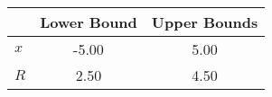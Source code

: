 \begin{tiny}\begin{tabular}{|l|c|c|}
\hline
&\textbf{Lower Bound}&\textbf{Upper Bounds}\\\hline
\textbf{$x$}&-5.00&5.00\\\hline
\textbf{$R$}&2.50&4.50\\\hline
\end{tabular}
\end{tiny}